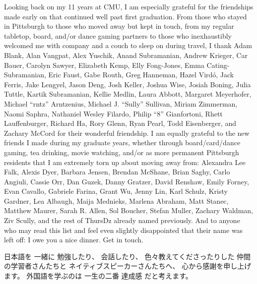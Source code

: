\documentclass[12pt]{cmuthesis}
\begin{document}
\begin{acknowledgments}
{Looking back on my 11 years at CMU,
I am especially grateful for the friendships made early on %
that continued well past first graduation.
From those who stayed in Pittsburgh %
to those who moved away but
kept in touch,
from my regular tabletop, board, and/or dance gaming partners
to those who inexhaustibly
welcomed me with company and
a couch to sleep on during travel,
I thank
Adam Blank,
Alan Vangpat,
Alex Yuschik,
Anand Subramanian,
Andrew Krieger,
Car Bauer,
Carolyn Sawyer,
Elizabeth Kemp,
Elly Fong-Jones,
Emma Cating-Subramanian,
Eric Faust,
Gabe Routh,
Greg Hanneman,
Hazel Vird\'{o},
Jack Ferris,
Jake Lengyel,
Jason Deng,
Josh Keller,
Joshua Wise,
Josiah Boning,
Julia Tuttle,
Kartik Subramanian,
Kellie Medlin,
Laura Abbott,
Margaret Meyerhofer,
Michael ``rntz'' Arntzenius,
Michael J. ``Sully'' Sullivan,
Miriam Zimmerman,
Naomi Saphra,
Nathaniel Wesley Filardo,
Philip ``8'' Gianfortoni,
Rhett Lauffenburger,
Richard Ha,
Rory Glenn,
Ryan Pearl,
Todd Eisenberger,
and
Zachary McCord
for their wonderful friendship.
I am equally grateful to the new friends I made during my graduate years,
whether through board/card/dance gaming, tea drinking, %
movie watching,
and/or as more permanent Pittsburgh residents that I am extremely torn up about moving away from:
Alexandra Lee Falk,
Alexis Dyer,
Barbara Jensen,
Brendan McShane,
Brian Saghy,
Carlo Angiuli,
Cassie Orr,
Dan Guzek,
Danny Gratzer,
David Renshaw,
Emily Forney,
Evan Cavallo,
Gabriele Farina,
Grant Wu,
Jenny Lin,
Karl Schulz,
Kristy Gardner,
Lea Albaugh,
Maija Mednieks,
Marlena Abraham,
Matt Stanec,
Matthew Maurer,
Sarah R. Allen,
Sol Boucher,
Stefan Muller,
Zachary Waldman,
Ziv Scully,
and the rest of ThursDz already named previously.
And to anyone who may read this list
and feel even slightly disappointed that their name was left off:
I owe you a nice dinner. Get in touch.

日本語を
一緒に
勉強したり、
会話したり、
色々教えてくださったりした
仲間の学習者さんたちと
ネイティブスピーカーさんたちへ、
心から感謝を申し上げます。
外国語を学ぶのは
一生の二番
達成感
だと考えます。

}
\end{acknowledgments}
\end{document}
